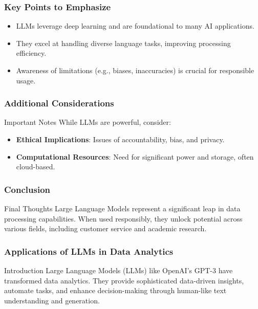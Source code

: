 \documentclass[aspectratio=169]{beamer}
\begin{document}
\begin{frame}[fragile]
    \frametitle{Key Points to Emphasize}
    \begin{itemize}
        \item LLMs leverage deep learning and are foundational to many AI applications.
        \item They excel at handling diverse language tasks, improving processing efficiency.
        \item Awareness of limitations (e.g., biases, inaccuracies) is crucial for responsible usage.
    \end{itemize}
\end{frame}

\begin{frame}[fragile]
    \frametitle{Additional Considerations}
    \begin{block}{Important Notes}
        While LLMs are powerful, consider:
        \begin{itemize}
            \item \textbf{Ethical Implications}: Issues of accountability, bias, and privacy.
            \item \textbf{Computational Resources}: Need for significant power and storage, often cloud-based.
        \end{itemize}
    \end{block}
\end{frame}

\begin{frame}[fragile]
    \frametitle{Conclusion}
    \begin{block}{Final Thoughts}
        Large Language Models represent a significant leap in data processing capabilities. When used responsibly, they unlock potential across various fields, including customer service and academic research.
    \end{block}
\end{frame}

\begin{frame}[fragile]
    \frametitle{Applications of LLMs in Data Analytics}
    \begin{block}{Introduction}
        Large Language Models (LLMs) like OpenAI's GPT-3 have transformed data analytics. They provide sophisticated data-driven insights, automate tasks, and enhance decision-making through human-like text understanding and generation.
    \end{block}
\end{frame}
\end{document}
